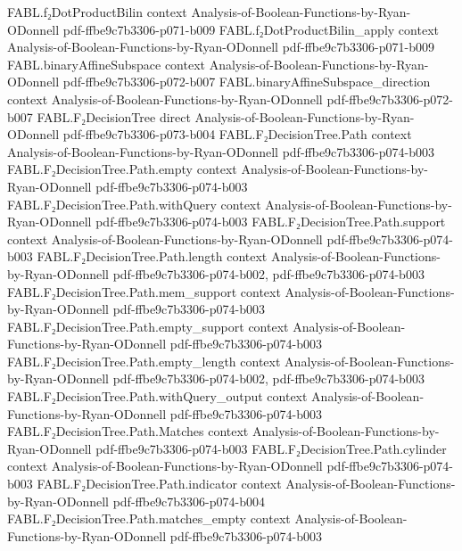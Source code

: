 \begin{theorem}
\proofstep
  {FABL.f₂DotProductBilin}
  {context}
  {Analysis-of-Boolean-Functions-by-Ryan-ODonnell}
  {pdf-ffbe9c7b3306-p071-b009}
\proofstep
  {FABL.f₂DotProductBilin_apply}
  {context}
  {Analysis-of-Boolean-Functions-by-Ryan-ODonnell}
  {pdf-ffbe9c7b3306-p071-b009}
\proofstep
  {FABL.binaryAffineSubspace}
  {context}
  {Analysis-of-Boolean-Functions-by-Ryan-ODonnell}
  {pdf-ffbe9c7b3306-p072-b007}
\proofstep
  {FABL.binaryAffineSubspace_direction}
  {context}
  {Analysis-of-Boolean-Functions-by-Ryan-ODonnell}
  {pdf-ffbe9c7b3306-p072-b007}
\proofstep
  {FABL.F₂DecisionTree}
  {direct}
  {Analysis-of-Boolean-Functions-by-Ryan-ODonnell}
  {pdf-ffbe9c7b3306-p073-b004}
\proofstep
  {FABL.F₂DecisionTree.Path}
  {context}
  {Analysis-of-Boolean-Functions-by-Ryan-ODonnell}
  {pdf-ffbe9c7b3306-p074-b003}
\proofstep
  {FABL.F₂DecisionTree.Path.empty}
  {context}
  {Analysis-of-Boolean-Functions-by-Ryan-ODonnell}
  {pdf-ffbe9c7b3306-p074-b003}
\proofstep
  {FABL.F₂DecisionTree.Path.withQuery}
  {context}
  {Analysis-of-Boolean-Functions-by-Ryan-ODonnell}
  {pdf-ffbe9c7b3306-p074-b003}
\proofstep
  {FABL.F₂DecisionTree.Path.support}
  {context}
  {Analysis-of-Boolean-Functions-by-Ryan-ODonnell}
  {pdf-ffbe9c7b3306-p074-b003}
\proofstep
  {FABL.F₂DecisionTree.Path.length}
  {context}
  {Analysis-of-Boolean-Functions-by-Ryan-ODonnell}
  {pdf-ffbe9c7b3306-p074-b002,
    pdf-ffbe9c7b3306-p074-b003}
\proofstep
  {FABL.F₂DecisionTree.Path.mem_support}
  {context}
  {Analysis-of-Boolean-Functions-by-Ryan-ODonnell}
  {pdf-ffbe9c7b3306-p074-b003}
\proofstep
  {FABL.F₂DecisionTree.Path.empty_support}
  {context}
  {Analysis-of-Boolean-Functions-by-Ryan-ODonnell}
  {pdf-ffbe9c7b3306-p074-b003}
\proofstep
  {FABL.F₂DecisionTree.Path.empty_length}
  {context}
  {Analysis-of-Boolean-Functions-by-Ryan-ODonnell}
  {pdf-ffbe9c7b3306-p074-b002,
    pdf-ffbe9c7b3306-p074-b003}
\proofstep
  {FABL.F₂DecisionTree.Path.withQuery_output}
  {context}
  {Analysis-of-Boolean-Functions-by-Ryan-ODonnell}
  {pdf-ffbe9c7b3306-p074-b003}
\proofstep
  {FABL.F₂DecisionTree.Path.Matches}
  {context}
  {Analysis-of-Boolean-Functions-by-Ryan-ODonnell}
  {pdf-ffbe9c7b3306-p074-b003}
\proofstep
  {FABL.F₂DecisionTree.Path.cylinder}
  {context}
  {Analysis-of-Boolean-Functions-by-Ryan-ODonnell}
  {pdf-ffbe9c7b3306-p074-b003}
\proofstep
  {FABL.F₂DecisionTree.Path.indicator}
  {context}
  {Analysis-of-Boolean-Functions-by-Ryan-ODonnell}
  {pdf-ffbe9c7b3306-p074-b004}
\proofstep
  {FABL.F₂DecisionTree.Path.matches_empty}
  {context}
  {Analysis-of-Boolean-Functions-by-Ryan-ODonnell}
  {pdf-ffbe9c7b3306-p074-b003}

\end{theorem}
